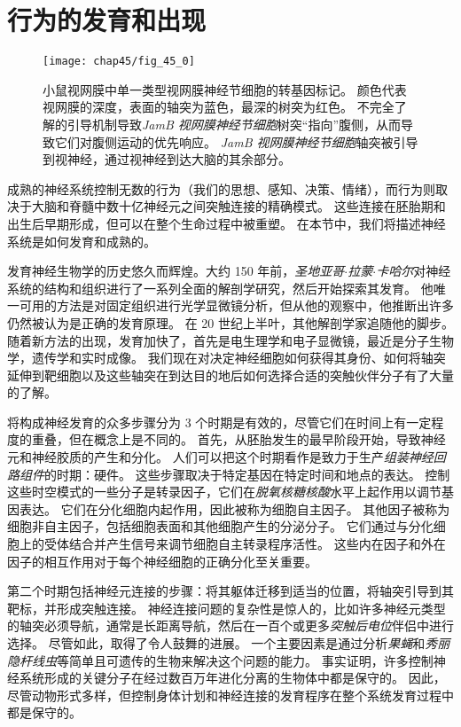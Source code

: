 \part{行为的发育和出现}

\begin{figure}[htbp]
	\centering
	\texttt{[image: chap45/fig\_45\_0]}
	\caption{小鼠视网膜中单一类型视网膜神经节细胞的转基因标记。
		颜色代表视网膜的深度，表面的轴突为蓝色，最深的树突为红色。
		不完全了解的引导机制导致\textit{JamB 视网膜神经节细胞}树突“指向”腹侧，从而导致它们对腹侧运动的优先响应。
		\textit{JamB 视网膜神经节细胞}轴突被引导到视神经，通过视神经到达大脑的其余部分。}
	\label{fig:45_0}
\end{figure}


成熟的神经系统控制无数的行为（我们的思想、感知、决策、情绪），而行为则取决于大脑和脊髓中数十亿神经元之间突触连接的精确模式。
这些连接在胚胎期和出生后早期形成，但可以在整个生命过程中被重塑。
在本节中，我们将描述神经系统是如何发育和成熟的。


发育神经生物学的历史悠久而辉煌。大约 150 年前，\textit{圣地亚哥$\cdot$拉蒙$\cdot$卡哈尔}对神经系统的结构和组织进行了一系列全面的解剖学研究，然后开始探索其发育。
他唯一可用的方法是对固定组织进行光学显微镜分析，但从他的观察中，他推断出许多仍然被认为是正确的发育原理。
在 20 世纪上半叶，其他解剖学家追随他的脚步。
随着新方法的出现，发育加快了，首先是电生理学和电子显微镜，最近是分子生物学，遗传学和实时成像。
我们现在对决定神经细胞如何获得其身份、如何将轴突延伸到靶细胞以及这些轴突在到达目的地后如何选择合适的突触伙伴分子有了大量的了解。


将构成神经发育的众多步骤分为 3 个时期是有效的，尽管它们在时间上有一定程度的重叠，但在概念上是不同的。
首先，从胚胎发生的最早阶段开始，导致神经元和神经胶质的产生和分化。
人们可以把这个时期看作是致力于生产\textit{组装神经回路组件}的时期：硬件。
这些步骤取决于特定基因在特定时间和地点的表达。
控制这些时空模式的一些分子是转录因子，它们在\textit{脱氧核糖核酸}水平上起作用以调节基因表达。
它们在分化细胞内起作用，因此被称为细胞自主因子。
其他因子被称为细胞非自主因子，包括细胞表面和其他细胞产生的分泌分子。
它们通过与分化细胞上的受体结合并产生信号来调节细胞自主转录程序活性。
这些内在因子和外在因子的相互作用对于每个神经细胞的正确分化至关重要。


第二个时期包括神经元连接的步骤：将其躯体迁移到适当的位置，将轴突引导到其靶标，并形成突触连接。
神经连接问题的复杂性是惊人的，比如许多神经元类型的轴突必须导航，通常是长距离导航，然后在一百个或更多\textit{突触后电位}伴侣中进行选择。
尽管如此，取得了令人鼓舞的进展。
一个主要因素是通过分析\textit{果蝇}和\textit{秀丽隐杆线虫}等简单且可遗传的生物来解决这个问题的能力。
事实证明，许多控制神经系统形成的关键分子在经过数百万年进化分离的生物体中都是保守的。
因此，尽管动物形式多样，但控制身体计划和神经连接的发育程序在整个系统发育过程中都是保守的。


